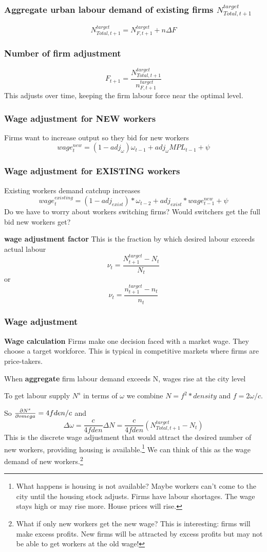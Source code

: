 {\subsubsection{Aggregate urban labour demand of existing firms $N_{Total,t+1}^{target}$} 
\[N_{Total,t+1}^{target}= N_{F,t+1}^{target}+n\Delta F\]

\subsubsection{Number of firm adjustment} 
\[F_{t+1}=\frac{N_{Total,t+1}^{target}}{n^{target}_{F,t+1}}\] 
This adjusts over time, keeping the firm labour force near the optimal level. 
{
\color{blue}
    \subsubsection{Wage adjustment for NEW workers} 
Firms want to increase output so they bid for new workers
\[wage_t^{new}= (1-adj_\omega)\omega_{t-1} + adj_\omega MPL_{t-1}  +\psi\] 

\subsubsection{Wage adjustment for EXISTING workers }
Existing workers demand catchup increases
\[ wage_t^{existing}= (1-adj_{exist})*\omega_{t-2} + adj_{exist}* wage_{t-1}^{new}  +\psi\]
Do we have to worry about workers switching firms? Would switchers get the full  bid new workers get? 
}
}
\textbf{wage adjustment factor} This is the fraction by which desired labour exceeds actual labour
\[\nu_t =\frac{N^{target}_{t+1}-N_{t}}{N_{t}}\]
or 
\[\nu_t =\frac{n^{target}_{t+1}-n_{t}}{n_{t}}\]



\subsubsection{Wage adjustment} 

\textbf{Wage calculation}
Firms make one decision faced with a market wage. They choose a target workforce. This is typical in \glspl{competitive market} where firms are price-takers. 


When \textbf{aggregate} firm labour demand exceeds N, wages rise at the city level

To get labour supply $N^s$ in terms of  $\omega$ we combine $N=f^2 *density$ and $f=2\omega/c$. 

So $\frac{\partial N^s}{\partial omega}=4fden/c$ and \[\Delta \omega=  \frac{c}{4fden}\Delta N = \frac{c}{4fden}(N_{Total,t+1}^{target}-N_t)\]
This is the discrete wage adjustment that would attract the desired number of new workers, providing housing is available.\footnote{What happens is housing is not available? Maybe workers can't come to the city until the housing stock adjusts. Firms have labour shortages.  The wage stays high or may rise more. House prices will rise.} We can think of this as the wage demand of new workers.\footnote{What if only new workers get the new wage? This is interesting: firms will make excess profits. New firms will be attracted by excess profits but may not be able to get workers at the old wage!}

